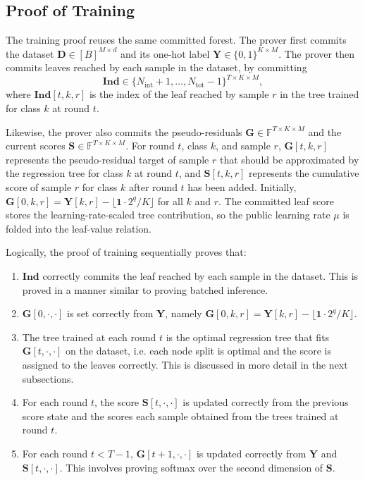 \subsection{Proof of Training}\label{subsec:method-training}

The training proof reuses the same committed forest. 
The prover first commits the dataset $\mathbf{D}\in [B]^{M\times d}$ and 
its one-hot label $\mathbf{Y}\in \{0, 1\}^{K\times M}$.
The prover then commits leaves reached by each sample in the dataset,
by committing
\[
\mathbf{Ind} \in
\{N_{\mathrm{int}}+1,\ldots,N_{\mathrm{tot}}-1\}^{T\times K\times M},
\]
where $\mathbf{Ind}[t, k, r]$ 
is the index of the leaf reached by sample
$r$ in the tree trained for class $k$ at round $t$.

Likewise, the prover also commits the pseudo-residuals
$\mathbf{G}\in \mathbb{F}^{T\times K\times M}$ and the current scores
$\mathbf{S}\in \mathbb{F}^{T\times K\times M}$.
For round $t$, class $k$, and sample $r$,
$\mathbf{G}[t,k,r]$ represents the pseudo-residual target of sample $r$ that
should be approximated by the regression tree for class $k$ at round $t$, and
$\mathbf{S}[t,k,r]$ represents the cumulative score of sample $r$ for class
$k$ after round $t$ has been added.
Initially, $\mathbf{G}[0,k,r]=\mathbf{Y}[k,r]-\lfloor\mathbf{1}\cdot 2^q/K\rfloor$ for all $k$ and $r$.
The committed leaf score stores the learning-rate-scaled tree contribution,
so the public learning rate $\mu$ is folded into the leaf-value relation.

Logically, the proof of training sequentially proves that:
\begin{enumerate}
  \item $\mathbf{Ind}$ correctly commits the leaf reached by each sample in the dataset.
    This is proved in a manner similar to proving batched inference.
  \item $\mathbf{G}[0, \cdot, \cdot]$ is set correctly from $\mathbf{Y}$,
    namely $\mathbf{G}[0,k,r]=\mathbf{Y}[k,r]-\lfloor\mathbf{1}\cdot 2^q/K\rfloor$.
  \item The tree trained at each round $t$ is the optimal regression tree that fits $\mathbf{G}[t, \cdot, \cdot]$ on the dataset,
    i.e. each node split is optimal and the score is assigned to the leaves correctly. This is discussed in more detail in the next subsections.
  \item For each round $t$, the score $\mathbf{S}[t, \cdot, \cdot]$ is updated correctly
    from the previous score state and the scores each sample obtained from the trees trained at round $t$.
  \item For each round $t<T-1$, $\mathbf{G}[t+1, \cdot, \cdot]$ is updated correctly from $\mathbf{Y}$ and $\mathbf{S}[t, \cdot, \cdot]$.
    This involves proving softmax over the second dimension of $\mathbf{S}$.
\end{enumerate}

